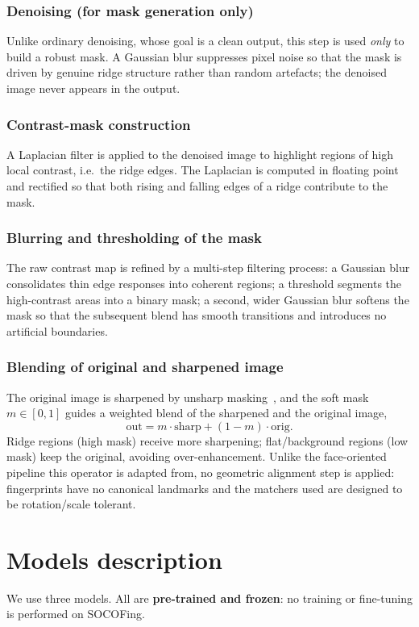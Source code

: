 \documentclass[11pt,a4paper]{article}
\begin{document}
\subsubsection{Denoising (for mask generation only)}
Unlike ordinary denoising, whose goal is a clean output, this step is used
\emph{only} to build a robust mask. A Gaussian blur suppresses pixel noise so that
the mask is driven by genuine ridge structure rather than random artefacts; the
denoised image never appears in the output.

\subsubsection{Contrast-mask construction}
A Laplacian filter is applied to the denoised image to highlight regions of high
local contrast, i.e.\ the ridge edges. The Laplacian is computed in floating point
and rectified so that both rising and falling edges of a ridge contribute to the
mask.

\subsubsection{Blurring and thresholding of the mask}
The raw contrast map is refined by a multi-step filtering process: a Gaussian blur
consolidates thin edge responses into coherent regions; a threshold segments the
high-contrast areas into a binary mask; a second, wider Gaussian blur softens the
mask so that the subsequent blend has smooth transitions and introduces no
artificial boundaries.

\subsubsection{Blending of original and sharpened image}
The original image is sharpened by unsharp masking~\cite{gonzalez}, and the soft
mask $m\in[0,1]$ guides a weighted blend of the sharpened and the original image,
\begin{equation}
\text{out} = m\cdot\text{sharp} + (1-m)\cdot\text{orig}.
\end{equation}
Ridge regions (high mask) receive more sharpening; flat/background regions (low
mask) keep the original, avoiding over-enhancement. Unlike the face-oriented
pipeline this operator is adapted from, no geometric alignment step is applied:
fingerprints have no canonical landmarks and the matchers used are designed to be
rotation/scale tolerant.

\section{Models description}
We use three models. All are \textbf{pre-trained and frozen}: no training or
fine-tuning is performed on SOCOFing.
\end{document}
